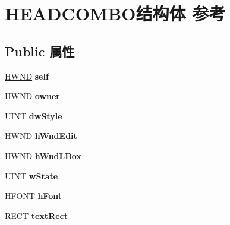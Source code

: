 \hypertarget{struct_h_e_a_d_c_o_m_b_o}{}\section{H\+E\+A\+D\+C\+O\+M\+B\+O结构体 参考}
\label{struct_h_e_a_d_c_o_m_b_o}
\subsection*{Public 属性}
\begin{DoxyCompactItemize}
\item 
\mbox{\label{struct_h_e_a_d_c_o_m_b_o_aa41ffbb234098b036d2b1ab97cf5326d}} 
\hyperlink{interfacevoid}{H\+W\+ND} {\bfseries self}
\item 
\mbox{\label{struct_h_e_a_d_c_o_m_b_o_a8b98bff53a008044595ed337f2be4d5a}} 
\hyperlink{interfacevoid}{H\+W\+ND} {\bfseries owner}
\item 
\mbox{\label{struct_h_e_a_d_c_o_m_b_o_ae4badb082818676e219b874f39705467}} 
U\+I\+NT {\bfseries dw\+Style}
\item 
\mbox{\label{struct_h_e_a_d_c_o_m_b_o_aa0e77b5e9a8bcfd3617a022b720bcc65}} 
\hyperlink{interfacevoid}{H\+W\+ND} {\bfseries h\+Wnd\+Edit}
\item 
\mbox{\label{struct_h_e_a_d_c_o_m_b_o_a55882b468e32147884647009fd9689ac}} 
\hyperlink{interfacevoid}{H\+W\+ND} {\bfseries h\+Wnd\+L\+Box}
\item 
\mbox{\label{struct_h_e_a_d_c_o_m_b_o_a50096a03a35db0df2fe35ccd88e30a49}} 
U\+I\+NT {\bfseries w\+State}
\item 
\mbox{\label{struct_h_e_a_d_c_o_m_b_o_ab31102c92ac295556bb2a09ba325826f}} 
H\+F\+O\+NT {\bfseries h\+Font}
\item 
\mbox{\label{struct_h_e_a_d_c_o_m_b_o_a3af47f60c7b1c6132e1da4626043bd8b}} 
\hyperlink{structtag_r_e_c_t}{R\+E\+CT} {\bfseries text\+Rect}
\item 
\mbox{\label{struct_h_e_a_d_c_o_m_b_o_a1026baec86c0501d37911f40929f2b1d}} 

\end{DoxyCompactItemize}
